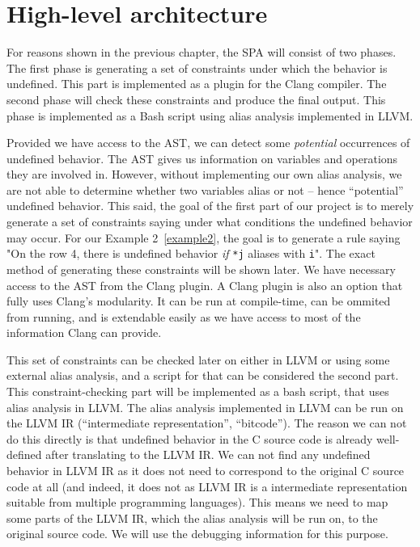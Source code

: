 \section{High-level architecture}
For reasons shown in the previous chapter, the SPA will consist of two phases. The first phase is generating a set of constraints under which the behavior is undefined. This part is implemented as a plugin for the Clang compiler. The second phase will check these constraints and produce the final output. This phase is implemented as a Bash script using alias analysis implemented in LLVM.

Provided we have access to the AST, we can detect some \emph{potential} occurrences of undefined behavior. The AST gives us information on variables and operations they are involved in. However, without implementing our own alias analysis, we are not able to determine whether two variables alias or not -- hence ``potential'' undefined behavior. This said, the goal of the first part of our project is to merely generate a set of constraints saying under what conditions the undefined behavior may occur. For our Example 2~\ref{example2}, the goal is to generate a rule saying "On the row 4, there is undefined behavior \emph{if} \verb|*j| aliases with \verb|i|". The exact method of generating these constraints will be shown later. We have necessary access to the AST from the Clang plugin. A Clang plugin is also an option that fully uses Clang's modularity. It can be run at compile-time, can be ommited from running, and is extendable easily as we have access to most of the information Clang can provide.

This set of constraints can be checked later on either in LLVM or using some external alias analysis, and a script for that can be considered the second part. This constraint-checking part will be implemented as a bash script, that uses alias analysis in LLVM. The alias analysis implemented in LLVM can be run on the LLVM IR (``intermediate representation'', ``bitcode''). The reason we can not do this directly is that undefined behavior in the C source code is already well-defined after translating to the LLVM IR. We can not find any undefined behavior in LLVM IR as it does not need to correspond to the original C source code at all (and indeed, it does not as LLVM IR is a intermediate representation suitable from multiple programming languages). This means we need to map some parts of the LLVM IR, which the alias analysis will be run on, to the original source code. We will use the debugging information for this purpose.

